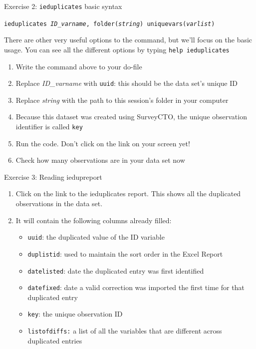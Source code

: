\documentclass[aspectratio=169]{beamer}
\begin{document}
\begin{frame}{Exercise 2: \texttt{ieduplicates} basic syntax}
    \begin{center}
        \large
        \texttt{ieduplicates \textit{ID\_varname}, folder(\textit{string}) uniquevars(\textit{varlist})}    
    \end{center}    
There are other very useful options to the command, but we'll focus on the basic usage. You can see all the different options by typing \texttt{help ieduplicates}

    \begin{enumerate}
        \item Write the command above to your do-file
        \item Replace \textit{ID\_varname} with \texttt{uuid}: this should be the data set's unique ID
        \item Replace \textit{string} with the path to this session's folder in your computer
        \item Because this dataset was created using SurveyCTO, the unique observation identifier is called \texttt{key}
        \item Run the code. Don't click on the link on your screen yet!
        \item Check how many observations are in your data set now
    \end{enumerate}
\end{frame}

\begin{frame}{Exercise 3: Reading iedupreport}
    \begin{enumerate}
        \item Click on the link to the ieduplicates report. This shows all the duplicated observations in the data set.
        \item It will contain the following columns already filled:
        \begin{itemize}
            \item \texttt{uuid}: the duplicated value of the ID variable
            \item \texttt{duplistid}: used to maintain the sort order in the Excel Report
            \item \texttt{datelisted}: date the duplicated entry was first identified
            \item \texttt{datefixed}: date a valid correction was imported the first time for that duplicated entry
            \item \texttt{key}: the unique observation ID
            \item \texttt{listofdiffs:} a list of all the variables that are different across duplicated entries
        \end{itemize}
    \end{enumerate}
\end{frame}
\end{document}
